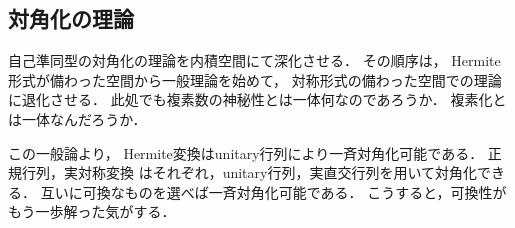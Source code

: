 \documentclass[uplatex, dvipdfmx]{jsreport}
\begin{document}
\subsection{対角化の理論}\label{subsec-可換性と対角化}

\begin{tcolorbox}[colframe=ForestGreen, colback=ForestGreen!10!white, breakable]
    自己準同型の対角化の理論を内積空間にて深化させる．
    その順序は，
    Hermite形式が備わった空間から一般理論を始めて，
    対称形式の備わった空間での理論に退化させる．
    此処でも複素数の神秘性とは一体何なのであろうか．
    複素化とは一体なんだろうか．

    この一般論より，
    Hermite変換はunitary行列により一斉対角化可能である．
    正規行列，実対称変換
    はそれぞれ，unitary行列，実直交行列を用いて対角化できる．
    互いに可換なものを選べば一斉対角化可能である．
    こうすると，可換性がもう一歩解った気がする．
\end{tcolorbox}
\end{document}
